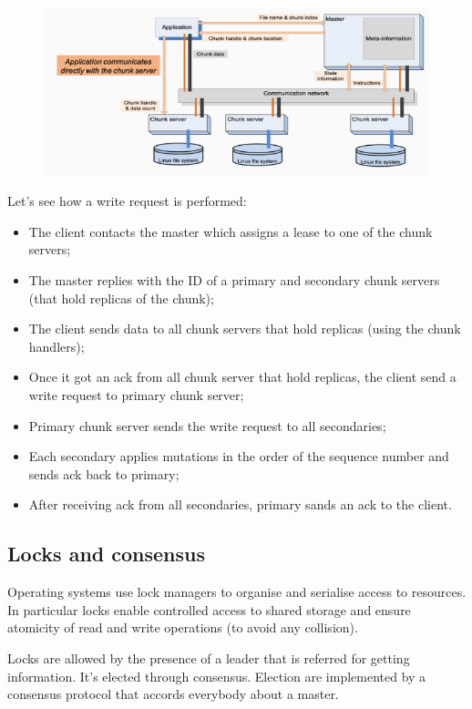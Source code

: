 \begin{figure}[h!]
    \centering
    \includegraphics[scale=0.35]{images/GFS arch.png}
\end{figure}

Let's see how a write request is performed:
\begin{itemize}
    \item The client contacts the master which assigns a lease to one of the chunk servers; 
    \item The master replies with the ID of a primary and secondary chunk servers (that hold replicas of the chunk);
    \item The client sends data to all chunk servers that hold replicas (using the chunk handlers);
    \item Once it got an ack from all chunk server that hold replicas, the client send a write request to primary chunk server; 
    \item Primary chunk server sends the write request to all secondaries;
    \item Each secondary applies mutations in the order of the sequence number and sends ack back to primary;
    \item After receiving ack from all secondaries, primary sands an ack to the client.
\end{itemize}


\subsection{Locks and consensus}
Operating systems use lock managers to organise and serialise access to resources. In particular locks enable controlled access to shared storage and ensure atomicity of read and write operations (to avoid any collision).

Locks are allowed by the presence of a leader that is referred for getting information. It's elected through consensus. Election are implemented by a consensus protocol that accords everybody about a master.

